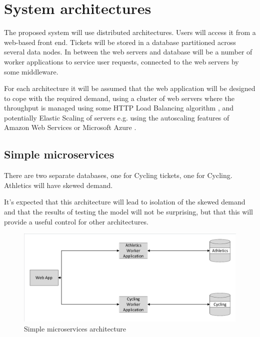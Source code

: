 %
%

\section{System architectures}

The proposed system will use distributed architectures.  Users will access it from a web-based front end.  Tickets will be stored in a database partitioned across several data nodes.  In between the web servers and database will be a number of worker applications to service user requests, connected to the web servers by some middleware.

For each architecture it will be assumed that the web application will be designed to cope with the required demand, using a cluster of web servers where the throughput is managed using some HTTP Load Balancing algorithm \cite{gilly2011up}, and potentially Elastic Scaling of servers e.g. using the autoscaling features of Amazon Web Services \cite{awsautoscaling} or Microsoft Azure \cite{azurescalesets}.

%
%
\subsection{Simple microservices}

There are two separate databases, one for Cycling tickets, one for Cycling.  Athletics will have skewed demand.

It's expected that this architecture will lead to isolation of the skewed demand and that the results of testing the model will not be surprising, but that this will provide a useful control for other architectures.

\begin{figure}
	\caption{Simple microservices architecture}
	\centering
	\includegraphics[trim = 5 5 5 5, clip, width=\textwidth]{img/simplemicro}
\end{figure}

